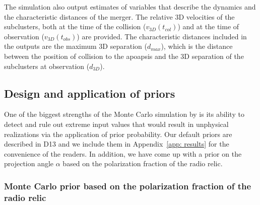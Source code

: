 The simulation also output estimates of variables that describe
the dynamics and the characteristic distances of the merger. The relative
3D velocities of the subclusters, both at the time of the
collision ($v_{3D}(t_{col})$) and at the time of observation
($v_{3D}(t_{obs})$) are provided. The characteristic
distances included in the outputs are the maximum 3D separation ($d_{max}$),
which is the distance between the position of collision to
the apoapsis and the 3D separation of the subclusters at observation
($d_{3D}$). 
\subsection{Design and application of priors} 
\label{sec:priors}
%
One of the biggest strengths of the Monte Carlo simulation by  is its ability
to detect and rule out extreme input values that would result in
unphysical realizations via the application of prior probability. 
Our default priors are described in D13 and we include them in Appendix~\ref{app: results} for the convenience of the readers. 
In addition, we have come up with a prior on the projection angle $\alpha$
based on the polarization fraction of the radio relic.

\subsubsection{Monte Carlo prior based on the polarization fraction of the radio relic}
%

